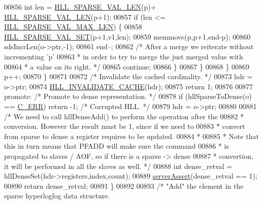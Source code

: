 \begin{DoxyCode}
{{00856                 \textcolor{keywordtype}{int} len = \hyperlink{hyperloglog_8c_a5c74b3b50c822c01c1976a72b84db12f}{HLL\_SPARSE\_VAL\_LEN}(p)+
      \hyperlink{hyperloglog_8c_a5c74b3b50c822c01c1976a72b84db12f}{HLL\_SPARSE\_VAL\_LEN}(p+1);
00857                 \textcolor{keywordflow}{if} (len <= \hyperlink{hyperloglog_8c_ac4d915198fed97094a5ad89223a06429}{HLL\_SPARSE\_VAL\_MAX\_LEN}) \{
00858                     \hyperlink{hyperloglog_8c_a27a040f2d48978974a593fdc306241f9}{HLL\_SPARSE\_VAL\_SET}(p+1,v1,len);
00859                     memmove(p,p+1,end-p);
00860                     sdsIncrLen(o->ptr,-1);
00861                     end--;
00862                     \textcolor{comment}{/* After a merge we reiterate without incrementing 'p'}
00863 \textcolor{comment}{                     * in order to try to merge the just merged value with}
00864 \textcolor{comment}{                     * a value on its right. */}
00865                     \textcolor{keywordflow}{continue};
00866                 \}
00867             \}
00868         \}
00869         p++;
00870     \}
00871 
00872     \textcolor{comment}{/* Invalidate the cached cardinality. */}
00873     hdr = o->ptr;
00874     \hyperlink{hyperloglog_8c_aba6246a823dc41dc866a6af8828ae375}{HLL\_INVALIDATE\_CACHE}(hdr);
00875     \textcolor{keywordflow}{return} 1;
00876 
00877 promote: \textcolor{comment}{/* Promote to dense representation. */}
00878     \textcolor{keywordflow}{if} (hllSparseToDense(o) == \hyperlink{server_8h_af98ac28d5f4d23d7ed5985188e6fb7d1}{C\_ERR}) \textcolor{keywordflow}{return} -1; \textcolor{comment}{/* Corrupted HLL. */}
00879     hdr = o->ptr;
00880 
00881     \textcolor{comment}{/* We need to call hllDenseAdd() to perform the operation after the}
00882 \textcolor{comment}{     * conversion. However the result must be 1, since if we need to}
00883 \textcolor{comment}{     * convert from sparse to dense a register requires to be updated.}
00884 \textcolor{comment}{     *}
00885 \textcolor{comment}{     * Note that this in turn means that PFADD will make sure the command}
00886 \textcolor{comment}{     * is propagated to slaves / AOF, so if there is a sparse -> dense}
00887 \textcolor{comment}{     * convertion, it will be performed in all the slaves as well. */}
00888     \textcolor{keywordtype}{int} dense\_retval = hllDenseSet(hdr->registers,index,count);
00889     \hyperlink{server_8h_a88114b5169b4c382df6b56506285e56a}{serverAssert}(dense\_retval == 1);
00890     \textcolor{keywordflow}{return} dense\_retval;
00891 \}
00892 
00893 \textcolor{comment}{/* "Add" the element in the sparse hyperloglog data structure.}
}}
\end{DoxyCode}
